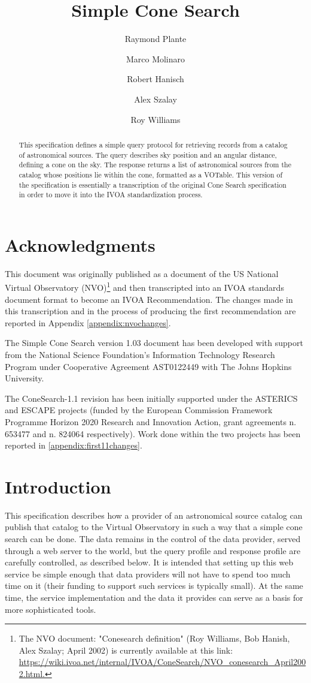 \documentclass[11pt,a4paper]{ivoa}
\title{Simple Cone Search}
\author[http://www.ivoa.net/twiki/bin/view/IVOA/RayPlante]{Raymond Plante}
\author[http://www.ivoa.net/twiki/bin/view/IVOA/MarcoMolinaro]{Marco Molinaro}
\author[http://www.ivoa.net/twiki/bin/view/IVOA/BobHanisch]{Robert Hanisch}
\author[http://www.ivoa.net/twiki/bin/view/IVOA/AlexSzalay]{Alex Szalay}
\author[http://www.ivoa.net/twiki/bin/view/IVOA/RoyWilliams]{Roy Williams}
\begin{document}
\begin{abstract} This specification defines a simple
query protocol for retrieving records from a catalog of astronomical
sources. The query describes sky position and an angular distance,
defining a cone on the sky. The response returns a list of astronomical
sources from the catalog whose positions lie within the cone, formatted
as a VOTable. This version of the specification is essentially a
transcription of the original Cone Search specification in order to move
it into the IVOA standardization process. \end{abstract}


\section*{Acknowledgments} 

This document was originally published as a
document of the US National Virtual Observatory (NVO)\footnote{The NVO
document: "Conesearch definition" (Roy Williams, Bob Hanish, Alex
Szalay; April 2002) is currently available at this link:
\url{https://wiki.ivoa.net/internal/IVOA/ConeSearch/NVO\_conesearch\_April2002.html.}}
and then transcripted into an IVOA standards document format to become
an IVOA Recommendation. The changes made in this transcription and in
the process of producing the first recommendation are reported in
Appendix \ref{appendix:nvochanges}.

The Simple Cone Search version 1.03 document has been developed with
support from the National Science Foundation's Information Technology
Research Program under Cooperative Agreement AST0122449 with The Johns
Hopkins University.

The ConeSearch-1.1 revision has been initially supported under the
ASTERICS and ESCAPE projects (funded by the European Commission
Framework Programme Horizon 2020 Research and Innovation Action, grant
agreements n. 653477 and n. 824064 respectively). Work done within the
two projects has been reported in \ref{appendix:first11changes}.

\section{Introduction}

This specification describes how a provider of an astronomical source
catalog can publish that catalog to the Virtual Observatory in such a
way that a simple cone search can be done. The data remains in the
control of the data provider, served through a web server to the world,
but the query profile and response profile are carefully controlled, as
described below. It is intended that setting up this web service be
simple enough that data providers will not have to spend too much time
on it (their funding to support such services is typically small). At
the same time, the service implementation and the data it provides can
serve as a basis for more sophisticated tools.
\end{document}
